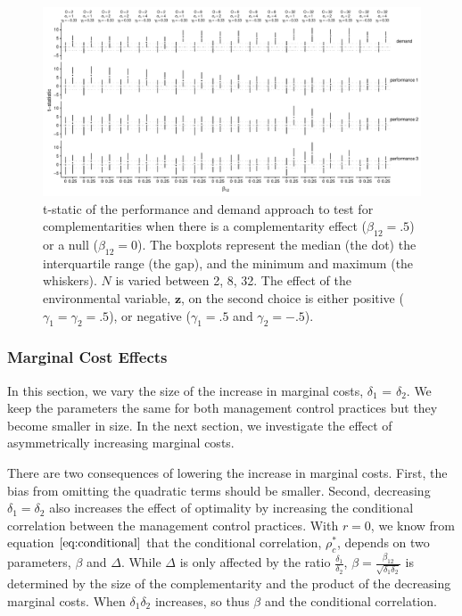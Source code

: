 \documentclass[12pt]{article}
\begin{document}
\begin{figure}

\includegraphics[width=500px]{figure-latex/noise_plot.pdf}
\caption[Error Rate and Power with Increasing Levels of Variability in Performance]
{\label{noise} t-static of the performance and demand approach to test
for complementarities when there is a complementarity effect ($\beta_{12} = .5$)
or a null ($\beta_{12} = 0$). The boxplots represent the median (the dot) the
interquartile range (the gap), and the minimum and maximum (the whiskers). $N$
is varied between 2, 8, 32. The effect of the environmental
variable, $\mathbf{z}$, on the second choice is either positive
($\gamma_1 = \gamma_2 = .5$), or
negative ($\gamma_1 = .5$ and $\gamma_2 = -.5$).}
\end{figure}



\subsubsection{Marginal Cost Effects}\label{marginal-cost-effects}
 
In this section, we vary the size of the increase in marginal costs, \(\delta_1\) = \(\delta_2\). We keep the parameters the same for both management control practices but they become smaller in size. In the next section, we investigate the effect of asymmetrically increasing marginal costs.

There are two consequences of lowering the increase in marginal costs. First, the bias from omitting the quadratic terms should be smaller. Second, decreasing \(\delta_1 = \delta_2\) also increases the effect of optimality by increasing the conditional correlation between the management control practices. With \(r=0\), we know from equation \(\eqref{eq:conditional}\) that the conditional correlation, \(\rho^*_c\), depends on two parameters, \(\beta\) and \(\Delta\). While \(\Delta\) is only affected by the ratio \(\frac{\delta_1}{\delta_2}\), \(\beta = \frac{\beta_{12}}{\sqrt{\delta_1 \delta_2}}\) is determined by the size of the complementarity and the product of the decreasing marginal costs. When \(\delta_1 \delta_2\) increases, so thus \(\beta\) and the conditional correlation.
\end{document}
